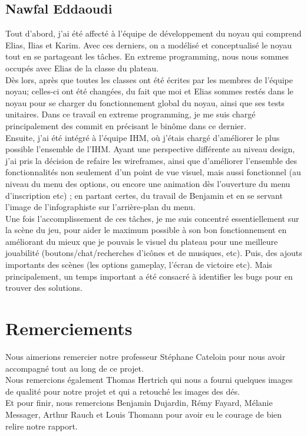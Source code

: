 \documentclass[a4paper,11pt]{article}
\begin{document}
\subsection{Nawfal Eddaoudi}

    Tout d'abord, j'ai été affecté à l'équipe de développement du noyau qui comprend Elias, Ilias et Karim. Avec ces derniers, on a modélisé et conceptualisé le noyau tout en se partageant les tâches. En extreme programming, nous nous sommes occupés avec Elias de la classe du plateau. \\

    Dès lors, après que toutes les classes ont été écrites par les membres de l'équipe noyau; celles-ci ont été changées, du fait que moi et Elias sommes restés dans le noyau pour se charger du fonctionnement global du noyau, ainsi que ses tests unitaires. Dans ce travail en extreme programming, je me suis chargé principalement des commit en précisant le binôme dans ce dernier. \\

    Ensuite, j'ai été intégré à l'équipe IHM, où j'étais chargé d'améliorer le plus possible l'ensemble de l'IHM. Ayant une perspective différente au niveau design, j'ai pris la décision de refaire les wireframes, ainsi que d'améliorer l'ensemble des fonctionnalités non seulement d'un point de vue visuel, mais aussi fonctionnel (au niveau du menu des options, ou encore une animation dès l'ouverture du menu d'inscription etc) ;  en partant certes, du travail de Benjamin et en se servant l'image de l'infographiste sur l'arrière-plan du menu. \\

    Une fois l'accomplissement de ces tâches, je me suis concentré essentiellement sur la scène du jeu, pour aider le maximum possible à son bon fonctionnement en améliorant du mieux que je pouvais le visuel du plateau pour une meilleure jouabilité (boutons/chat/recherches d'icônes et de musiques, etc). Puis, des ajouts importants des scènes (les options gameplay, l'écran de victoire etc). Mais principalement, un temps important a été consacré à identifier les bugs pour en trouver des solutions.\\


\newpage

\section{Remerciements}

    Nous aimerions remercier notre professeur Stéphane Cateloin pour nous avoir accompagné tout au long de ce projet.  \\
    Nous remercions également Thomas Hertrich qui nous a fourni quelques images de qualité pour notre projet et qui a retouché les images des dés.  \\
    Et pour finir, nous remercions Benjamin Dujardin, Rémy Fayard, Mélanie Messager, Arthur Rauch et Louis Thomann pour avoir eu le courage de bien relire notre rapport. \\
\end{document}
